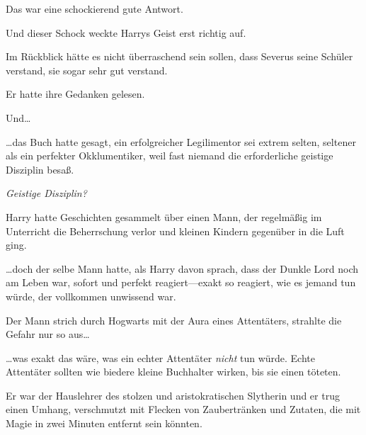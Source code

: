 Das war eine schockierend gute Antwort.

Und dieser Schock weckte Harrys Geist erst richtig auf.

Im Rückblick hätte es nicht überraschend sein sollen, dass Severus seine Schüler verstand, sie sogar sehr gut verstand.

Er hatte ihre Gedanken gelesen.

Und…

…das Buch hatte gesagt, ein erfolgreicher Legilimentor sei extrem selten, seltener als ein perfekter Okklumentiker, weil fast niemand die erforderliche geistige Disziplin besaß.

\emph{Geistige Disziplin?}

Harry hatte Geschichten gesammelt über einen Mann, der regelmäßig im Unterricht die Beherrschung verlor und kleinen Kindern gegenüber in die Luft ging.

…doch der selbe Mann hatte, als Harry davon sprach, dass der Dunkle Lord noch am Leben war, sofort und perfekt reagiert—exakt so reagiert, wie es jemand tun würde, der vollkommen unwissend war.

Der Mann strich durch Hogwarts mit der Aura eines Attentäters, strahlte die Gefahr nur so aus…

…was exakt das wäre, was ein echter Attentäter \emph{nicht} tun würde. Echte Attentäter sollten wie biedere kleine Buchhalter wirken, bis sie einen töteten.

Er war der Hauslehrer des stolzen und aristokratischen Slytherin und er trug einen Umhang, verschmutzt mit Flecken von Zaubertränken und Zutaten, die mit Magie in zwei Minuten entfernt sein könnten.

